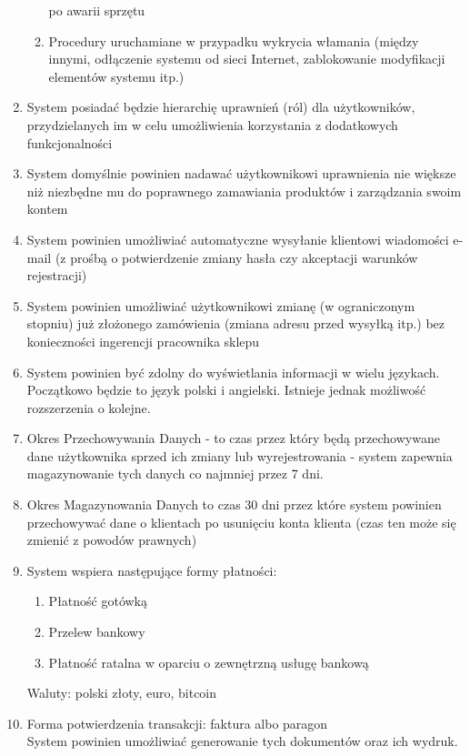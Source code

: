 \begin{enumerate}
\begin{enumerate}
    po awarii sprzętu
    \item Procedury uruchamiane w przypadku wykrycia włamania (między innymi,
    odłączenie systemu od sieci Internet, zablokowanie modyfikacji elementów
    systemu itp.)
  \end{enumerate} 
  \item System posiadać będzie hierarchię uprawnień (ról) dla użytkowników,
  przydzielanych im w celu umożliwienia korzystania z dodatkowych
  funkcjonalności
  \item System domyślnie powinien nadawać użytkownikowi uprawnienia nie większe
  niż niezbędne mu do poprawnego zamawiania produktów i zarządzania swoim
  kontem
  \item System powinien umożliwiać automatyczne wysyłanie klientowi wiadomości
  e-mail (z prośbą o potwierdzenie zmiany hasła czy akceptacji warunków rejestracji)
  \item System powinien umożliwiać użytkownikowi zmianę (w ograniczonym stopniu)
  już złożonego zamówienia (zmiana adresu przed wysyłką itp.) bez konieczności
  ingerencji pracownika sklepu
  \item System powinien być zdolny do wyświetlania informacji w wielu językach.
  Początkowo będzie to język polski i angielski. Istnieje jednak możliwość
  rozszerzenia o kolejne.
  \item \label{itm:OPD} Okres Przechowywania Danych - to czas przez który będą
  przechowywane dane użytkownika sprzed ich zmiany lub wyrejestrowania - system zapewnia
  magazynowanie tych danych co najmniej przez 7 dni.
  \item \label{itm:OMD} Okres Magazynowania Danych to czas 30 dni przez które
  system powinien przechowywać dane o klientach po usunięciu konta klienta (czas ten może się
  zmienić z powodów prawnych)
  \item \label{itm:Platnosci} System wspiera następujące formy płatności:
  \begin{enumerate}
    \item Płatność gotówką
    \item Przelew bankowy
    \item Płatność ratalna w oparciu o zewnętrzną usługę bankową
  \end{enumerate}
  Waluty: polski złoty, euro, bitcoin
  \item \label{itm:PotwierdzenieTransakcji} Forma potwierdzenia transakcji:
  faktura albo paragon
  \\
  System powinien umożliwiać generowanie tych dokumentów oraz ich wydruk.
  
\end{enumerate}